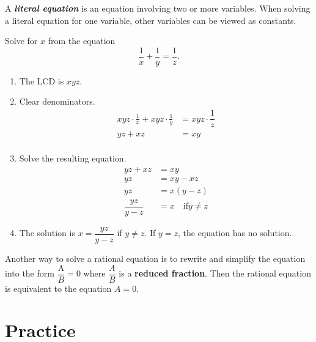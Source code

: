 \documentclass[
  en,11pt]{elegantbook}
\providecommand{\tightlist}{%
  \setlength{\itemsep}{0pt}\setlength{\parskip}{0pt}}
\newcommand{\size}[2]{{\fontsize{#1}{0}\selectfont#2}}
\renewenvironment{example}[1][]{
  \refstepcounter{exam}
  \par\noindent\textbf{\color{main}{\examplename} \theexam #1}
  \rmfamily
}{
  \par\ignorespacesafterend
}
\newenvironment{rmdnote}{
	\vspace*{0.5\baselineskip}
    \par\noindent
    \makebox[-3pt][r]{\color{red!90}\size{8}{\textdbend}\,\,}
    \begin{tcolorbox}[
    title={\textbf{\color{second}Note}},
    title style={left color=blue!10!green!20!white,right color=yellow!20!blue!20!white},
    colback=red!10!white,
    ]
    \itshape
}{
    \end{tcolorbox}
    \par\ignorespacesafterend
}
\begin{document}
A \textbf{\emph{literal equation}} is an equation involving two or more variables. When solving a literal equation for one variable, other variables can be viewed as constants.

\begin{example}
Solve for \(x\) from the equation
\[
\frac{1}{x}+\frac{1}{y}=\dfrac{1}{z}.
\]
\end{example}

\begin{solution}



\begin{enumerate}
\def\labelenumi{\arabic{enumi}.}
\tightlist
\item
  The LCD is \(xyz\).
\item
  Clear denominators.
  \[
       \begin{aligned}
           xyz\cdot\frac{1}{x}+xyz\cdot\frac{1}{y}&=xyz\cdot\dfrac{1}{z}\\
           yz+xz&=xy\\
       \end{aligned}
   \]
\item
  Solve the resulting equation.
  \[
       \begin{aligned}
           yz+xz&=xy\\
           yz&=xy-xz\\
           yz&=x(y-z)\\
           \dfrac{yz}{y-z}&=x \quad \text{if} y\neq z
       \end{aligned}
   \]
\item
  The solution is \(x=\dfrac{yz}{y-z}\) if \(y\neq z\). If \(y=z\), the equation has no solution.
\end{enumerate}

\end{solution}

\begin{rmdnote}

Another way to solve a rational equation is to rewrite and simplify the equation into the form \(\dfrac{\text{A}}{B}=0\) where \(\dfrac{A}{B}\) is a \textbf{reduced fraction}. Then the rational equation is equivalent to the equation \(A=0\).

\end{rmdnote}

\newpage

\hypertarget{practice-6}{%
\section{Practice}\label{practice-6}}
\end{document}
